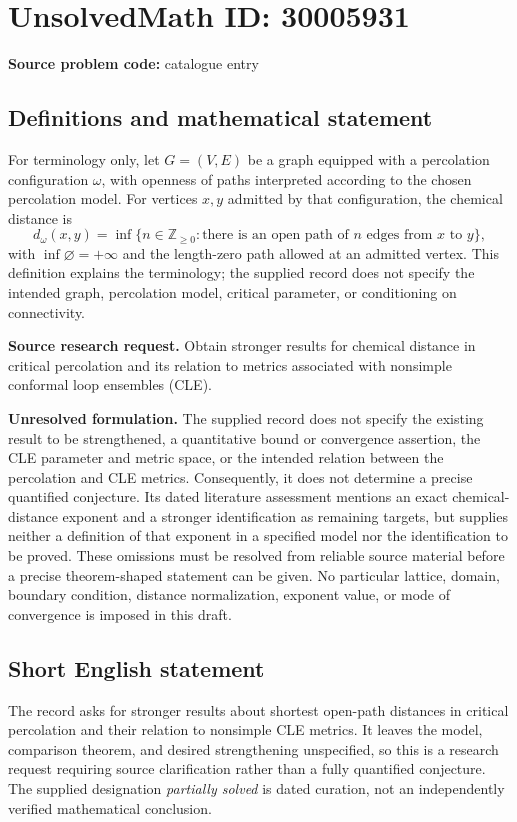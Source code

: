 \documentclass[11pt]{article}
\newcommand{\Z}{\mathbb{Z}}
\begin{document}
\section*{UnsolvedMath ID: 30005931}
\textbf{Source problem code:} catalogue entry
\subsection{Definitions and mathematical statement}
For terminology only, let \(G=(V,E)\) be a graph equipped with a percolation configuration \(\omega\), with openness of paths interpreted according to the chosen percolation model. For vertices \(x,y\) admitted by that configuration, the chemical distance is
\[
d_\omega(x,y)=\inf\bigl\{n\in\Z_{\geq 0}:\text{there is an open path of }n\text{ edges from }x\text{ to }y\bigr\},
\]
with \(\inf\varnothing=+\infty\) and the length-zero path allowed at an admitted vertex. This definition explains the terminology; the supplied record does not specify the intended graph, percolation model, critical parameter, or conditioning on connectivity.

\textbf{Source research request.} Obtain stronger results for chemical distance in critical percolation and its relation to metrics associated with nonsimple conformal loop ensembles (CLE).

\textbf{Unresolved formulation.} The supplied record does not specify the existing result to be strengthened, a quantitative bound or convergence assertion, the CLE parameter and metric space, or the intended relation between the percolation and CLE metrics. Consequently, it does not determine a precise quantified conjecture. Its dated literature assessment mentions an exact chemical-distance exponent and a stronger identification as remaining targets, but supplies neither a definition of that exponent in a specified model nor the identification to be proved. These omissions must be resolved from reliable source material before a precise theorem-shaped statement can be given. No particular lattice, domain, boundary condition, distance normalization, exponent value, or mode of convergence is imposed in this draft.
\subsection{Short English statement}
The record asks for stronger results about shortest open-path distances in critical percolation and their relation to nonsimple CLE metrics. It leaves the model, comparison theorem, and desired strengthening unspecified, so this is a research request requiring source clarification rather than a fully quantified conjecture. The supplied designation \emph{partially solved} is dated curation, not an independently verified mathematical conclusion.
\end{document}
